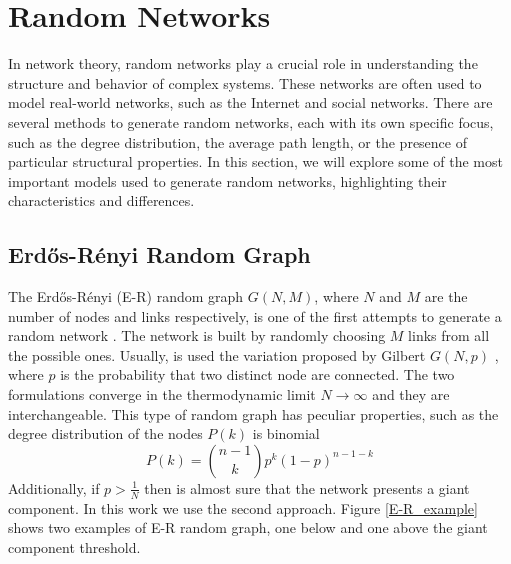 \section{Random Networks}
In network theory, random networks play a crucial role in understanding the structure and behavior of complex systems. These networks are often used to model real-world networks, such as the Internet and social networks. There are several methods to generate random networks, each with its own specific focus, such as the degree distribution, the average path length, or the presence of particular structural properties. In this section, we will explore some of the most important models used to generate random networks, highlighting their characteristics and differences.

\subsection{Erd\H{o}s-Rényi Random Graph}

The Erd\H{o}s-Rényi (E-R) random graph $G(N,M)$, where $N$ and $M$ are the number of nodes and links respectively, is one of the first attempts to generate a random network \cite{erdos-renyi1960, Erdos-renyi1959}. The network is built by randomly choosing $M$ links from all the possible ones. Usually, is used the variation proposed by Gilbert $G(N,p)$ \cite{gilbert} , where $p$ is the probability that two distinct node are connected. The two formulations converge in the thermodynamic limit $N \rightarrow \infty$ and they are interchangeable.
This type of random graph has peculiar properties, such as the degree distribution of the nodes $P(k)$ is binomial
\begin{equation}
    P(k) = \binom{n-1}{k}p^k(1-p)^{n-1-k}
\end{equation} 
Additionally, if $p > \frac{1}{N}$ then is almost sure that the network presents a giant component.
In this work we use the second approach. Figure \ref{E-R_example} shows two examples of E-R random graph, one below and one above the giant component threshold.

